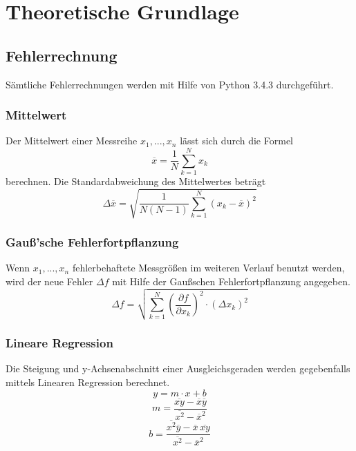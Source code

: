 \section{Theoretische Grundlage}
\label{sec:Theorie}








\subsection{Fehlerrechnung}
Sämtliche Fehlerrechnungen werden mit Hilfe von Python 3.4.3 durchgeführt.
\subsubsection{Mittelwert}
Der Mittelwert einer Messreihe $x_1, ... ,x_n$ lässt sich durch die Formel
\begin{equation}
	\overline{x} = \frac{1}{N} \sum_{k=1}^N x_k
	\label{eqn:ave}
\end{equation}
berechnen. Die Standardabweichung des Mittelwertes beträgt 
\begin{equation}
	\Delta \overline{x} = \sqrt{ \frac{1}{N(N-1)} \sum_{k=1}^N (x_k - \overline{x})^2}
	\label{eqn:std}
\end{equation}

\subsubsection{Gauß'sche Fehlerfortpflanzung}
Wenn $x_1, ..., x_n$ fehlerbehaftete Messgrößen im weiteren Verlauf benutzt werden, wird der neue Fehler $\Delta f$ mit Hilfe der Gaußschen Fehlerfortpflanzung angegeben.
\begin{equation}
	\Delta f = \sqrt{\sum_{k=1}^N \left( \frac{ \partial f}{\partial x_k} \right) ^2 \cdot (\Delta x_k)^2}
	\label{eqn:var}
\end{equation}

\subsubsection{Lineare Regression}
Die Steigung und y-Achsenabschnitt einer Ausgleichsgeraden werden gegebenfalls mittels Linearen Regression berechnet. 
\begin{equation}
	y = m \cdot x + b
	\label{eqn:reg}
\end{equation}
\begin{equation}
	m = \frac{ \overline{xy} - \overline{x} \overline{y} } {\overline{x^2} - \overline{x}^2}
	\label{eqn:reg_m}
\end{equation}
\begin{equation}
	b = \frac{ \overline{x^2}\overline{y} - \overline{x} \, \overline{xy}} { \overline{x^2} - \overline{x}^2}
	\label{eqn:reg_b}
\end{equation}

\cite{sample}
